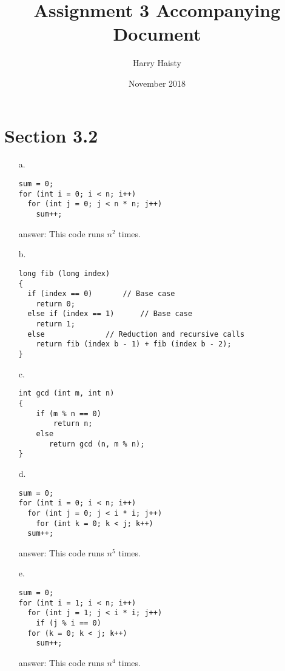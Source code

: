 \documentclass[11pt]{article}
\title{Assignment 3 Accompanying Document}
\author{Harry Haisty}
\date{November 2018}
\begin{document}
\maketitle

\section*{Section 3.2}
\begin{enumerate}
    
    \item[a.] 
    \begin{lstlisting}
sum = 0;
for (int i = 0; i < n; i++)
  for (int j = 0; j < n * n; j++)
    sum++;
    \end{lstlisting}
    
    \item[answer:] This code runs $n^2$ times.
    
    \item[b.]
    \begin{lstlisting}
long fib (long index)
{
  if (index == 0)		// Base case
    return 0;
  else if (index == 1)		// Base case
    return 1;
  else				// Reduction and recursive calls
    return fib (index b - 1) + fib (index b - 2);
}
    \end{lstlisting}
    
    
    \item[c.]
    \begin{lstlisting}
int gcd (int m, int n)
{
    if (m % n == 0)
        return n;
    else
       return gcd (n, m % n);
}
    \end{lstlisting}
    
    
    \item[d.]
    \begin{lstlisting}
sum = 0;
for (int i = 0; i < n; i++)
  for (int j = 0; j < i * i; j++)
    for (int k = 0; k < j; k++)
  sum++;
    \end{lstlisting}
    
    \item[answer:] This code runs $n^5$ times.
    
    
    \item[e.]
    \begin{lstlisting}
sum = 0;
for (int i = 1; i < n; i++)
  for (int j = 1; j < i * i; j++)
    if (j % i == 0)
  for (k = 0; k < j; k++)
    sum++;
    \end{lstlisting}
    
    \item[answer:] This code runs $n^4$ times.
    
\end{enumerate}
\end{document}
